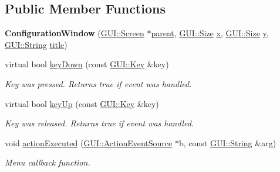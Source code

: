 \subsection*{Public Member Functions}
\begin{DoxyCompactItemize}
\item 
\hypertarget{classConfigurationWindow_aa024579e615b177a61410dc04b70d124}{{\bfseries Configuration\-Window} (\hyperlink{classGUI_1_1Screen}{G\-U\-I\-::\-Screen} $\ast$\hyperlink{classGUI_1_1Window_a2e593ff65e7702178d82fe9010a0b539}{parent}, \hyperlink{namespaceGUI_a10b6232e08729baa0bd211a86a69ce36}{G\-U\-I\-::\-Size} \hyperlink{classGUI_1_1Window_a6ca6a80ca00c9e1d8ceea8d3d99a657d}{x}, \hyperlink{namespaceGUI_a10b6232e08729baa0bd211a86a69ce36}{G\-U\-I\-::\-Size} \hyperlink{classGUI_1_1Window_a0ee8e923aff2c3661fc2e17656d37adf}{y}, \hyperlink{classGUI_1_1String}{G\-U\-I\-::\-String} \hyperlink{classGUI_1_1ToplevelWindow_a04de191f9a57b5b584657866a4ac6843}{title})}\label{classConfigurationWindow_aa024579e615b177a61410dc04b70d124}

\item 
\hypertarget{classConfigurationWindow_a50012cee347cd3023436746bcc3a7b38}{virtual bool \hyperlink{classConfigurationWindow_a50012cee347cd3023436746bcc3a7b38}{key\-Down} (const \hyperlink{classGUI_1_1Key}{G\-U\-I\-::\-Key} \&key)}\label{classConfigurationWindow_a50012cee347cd3023436746bcc3a7b38}

\begin{DoxyCompactList}\small\item\em Key was pressed. Returns true if event was handled. \end{DoxyCompactList}\item 
\hypertarget{classConfigurationWindow_aa38d03b7c12e26d301baaf5fc17bebc2}{virtual bool \hyperlink{classConfigurationWindow_aa38d03b7c12e26d301baaf5fc17bebc2}{key\-Up} (const \hyperlink{classGUI_1_1Key}{G\-U\-I\-::\-Key} \&key)}\label{classConfigurationWindow_aa38d03b7c12e26d301baaf5fc17bebc2}

\begin{DoxyCompactList}\small\item\em Key was released. Returns true if event was handled. \end{DoxyCompactList}\item 
\hypertarget{classConfigurationWindow_a2dac96be9ab39e51f0eabec372406664}{void \hyperlink{classConfigurationWindow_a2dac96be9ab39e51f0eabec372406664}{action\-Executed} (\hyperlink{classGUI_1_1ActionEventSource}{G\-U\-I\-::\-Action\-Event\-Source} $\ast$b, const \hyperlink{classGUI_1_1String}{G\-U\-I\-::\-String} \&arg)}\label{classConfigurationWindow_a2dac96be9ab39e51f0eabec372406664}

\begin{DoxyCompactList}\small\item\em Menu callback function. \end{DoxyCompactList}\end{DoxyCompactItemize}
